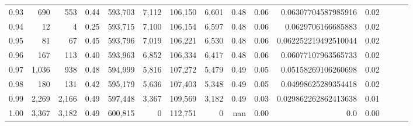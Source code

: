 \begin{tabular}{rrrrrrrrrrrrrrr}
0.93 &     690 &    553 &  0.44 &  593,703 &    7,112 &  106,150 &    6,601 &  0.48 &  0.06 &   0.06307704587985916 &      0.02 \\
0.94 &      12 &      4 &  0.25 &  593,715 &    7,100 &  106,154 &    6,597 &  0.48 &  0.06 &    0.0629706166685883 &      0.02 \\
0.95 &      81 &     67 &  0.45 &  593,796 &    7,019 &  106,221 &    6,530 &  0.48 &  0.06 &  0.062252219492510044 &      0.02 \\
0.96 &     167 &    113 &  0.40 &  593,963 &    6,852 &  106,334 &    6,417 &  0.48 &  0.06 &   0.06077107963565733 &      0.02 \\
0.97 &   1,036 &    938 &  0.48 &  594,999 &    5,816 &  107,272 &    5,479 &  0.49 &  0.05 &   0.05158269106260698 &      0.02 \\
0.98 &     180 &    131 &  0.42 &  595,179 &    5,636 &  107,403 &    5,348 &  0.49 &  0.05 &   0.04998625289354418 &      0.02 \\
0.99 &   2,269 &  2,166 &  0.49 &  597,448 &    3,367 &  109,569 &    3,182 &  0.49 &  0.03 &  0.029862262862413638 &      0.01 \\
1.00 &   3,367 &  3,182 &  0.49 &  600,815 &        0 &  112,751 &        0 &   nan &  0.00 &                   0.0 &      0.00 \\
\bottomrule
\end{tabular}
